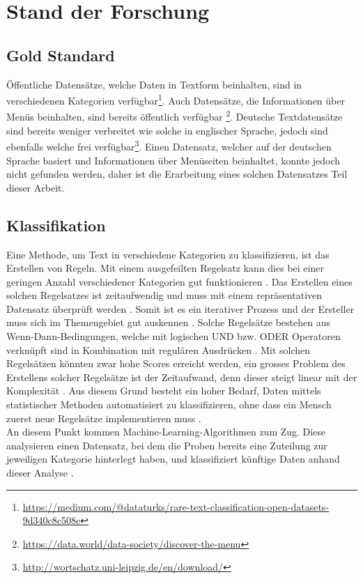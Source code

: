 \chapter{Stand der Forschung}
\section{Gold Standard}
Öffentliche Datensätze, welche Daten in Textform beinhalten, sind in verschiedenen Kategorien verfügbar\footnote{\url{https://medium.com/@dataturks/rare-text-classification-open-datasets-9d340c8c508e}}.
Auch Datensätze, die Informationen über Menüs beinhalten, sind bereits öffentlich verfügbar \footnote{\url{https://data.world/data-society/discover-the-menu}}.
Deutsche Textdatensätze sind bereits weniger verbreitet wie solche in englischer Sprache, jedoch sind ebenfalls welche frei verfügbar\footnote{\url{http://wortschatz.uni-leipzig.de/en/download/}}.
Einen Datensatz, welcher auf der deutschen Sprache basiert und Informationen über Menüseiten beinhaltet, konnte jedoch nicht gefunden werden, daher ist die Erarbeitung eines solchen Datensatzes Teil dieser Arbeit.
\section{Klassifikation}
Eine Methode, um Text in verschiedene Kategorien zu klassifizieren, ist das Erstellen von Regeln.
Mit einem ausgefeilten Regelsatz kann dies bei einer geringen Anzahl verschiedener Kategorien gut funktionieren \cite[p.125]{jackson2007natural}.
Das Erstellen eines solchen Regelsatzes ist zeitaufwendig und muss mit einem repräsentativen Datensatz überprüft werden \cite[p.125]{jackson2007natural}.
Somit ist es ein iterativer Prozess und der Ersteller muss sich im Themengebiet gut auskennen \cite[p.125]{jackson2007natural}.
Solche Regelsätze bestehen aus \glqq Wenn-Dann\grqq-Bedingungen, welche mit logischen \glqq UND\grqq{} bzw. \glqq ODER\grqq{} Operatoren verknüpft sind in Kombination mit regulären Ausdrücken \cite[p.126]{jackson2007natural}.
Mit solchen Regelsätzen könnten zwar hohe Scores erreicht werden, ein grosses Problem des Erstellens solcher Regelsätze ist der Zeitaufwand, denn dieser steigt linear mit der Komplexität \cite[p.127]{jackson2007natural}.
Aus diesem Grund besteht ein hoher Bedarf, Daten mittels statistischer Methoden automatisiert zu klassifizieren, ohne dass ein Mensch zuerst neue Regelsätze implementieren muss \cite[p.127]{jackson2007natural}.\\
An diesem Punkt kommen Machine-Learning-Algorithmen zum Zug.
Diese analysieren einen Datensatz, bei dem die Proben bereits eine Zuteilung zur jeweiligen Kategorie hinterlegt haben, und klassifiziert künftige Daten anhand dieser Analyse \cite[p.127]{jackson2007natural}. 